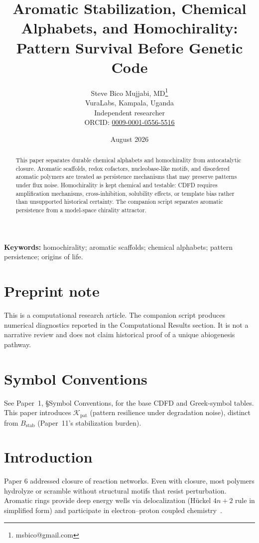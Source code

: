 \documentclass[11pt,a4paper]{article}
\title{Aromatic Stabilization, Chemical Alphabets, and Homochirality:\\ Pattern Survival Before Genetic Code}
\author{Steve Bico Mujjabi, MD\thanks{msbico@gmail.com}\\
VuraLabs, Kampala, Uganda\\
Independent researcher\\
ORCID: \href{https://orcid.org/0009-0001-0556-5516}{0009-0001-0556-5516}}
\date{August 2026}
\begin{document}
\maketitle

\begin{abstract}
This paper separates durable chemical alphabets and homochirality from autocatalytic closure. Aromatic scaffolds, redox cofactors, nucleobase-like motifs, and disordered aromatic polymers are treated as persistence mechanisms that may preserve patterns under flux noise. Homochirality is kept chemical and testable: CDFD requires amplification mechanisms, cross-inhibition, solubility effects, or template bias rather than unsupported historical certainty. The companion script separates aromatic persistence from a model-space chirality attractor.
\end{abstract}

\noindent\textbf{Keywords:} homochirality; aromatic scaffolds; chemical alphabets; pattern persistence; origins of life.

\section*{Preprint note}
This is a computational research article. The companion script produces numerical diagnostics reported in the Computational Results section. It is not a narrative review and does not claim historical proof of a unique abiogenesis pathway.

\section*{Symbol Conventions}

\noindent See Paper~1, \S Symbol Conventions, for the base CDFD and Greek-symbol tables. This paper introduces $\mathcal{K}_{\mathrm{pat}}$ (pattern resilience under degradation noise), distinct from $B_{\mathrm{stab}}$ (Paper~11's stabilization burden).

\section{Introduction}
Paper 6 addressed closure of reaction networks. Even with closure, most polymers hydrolyze or scramble without structural motifs that resist perturbation. Aromatic rings provide deep energy wells via delocalization (H\"uckel $4n+2$ rule in simplified form) and participate in electron--proton coupled chemistry~\cite{Joyce2012}.
\end{document}

